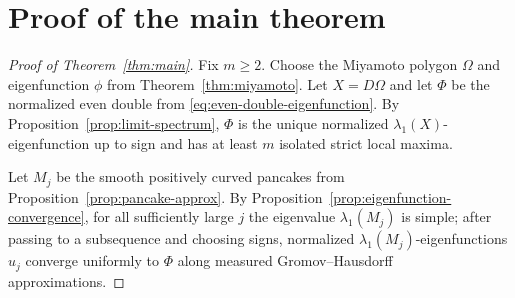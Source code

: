 \documentclass[11pt]{amsart}
\numberwithin{equation}{section}
\newcommand{\Om}{\Omega}
\begin{document}
\section{Proof of the main theorem}\label{sec:proof-main}

\begin{proof}[Proof of Theorem~\ref{thm:main}]
Fix $m\ge2$.  Choose the Miyamoto polygon $\Om$ and eigenfunction $\phi$ from
Theorem~\ref{thm:miyamoto}.  Let $X=D\Om$ and let $\Phi$ be the normalized even
double from \eqref{eq:even-double-eigenfunction}.  By
Proposition~\ref{prop:limit-spectrum}, $\Phi$ is the unique normalized
$\lambda_1(X)$-eigenfunction up to sign and has at least $m$ isolated strict
local maxima.

Let $M_j$ be the smooth positively curved pancakes from
Proposition~\ref{prop:pancake-approx}.  By
Proposition~\ref{prop:eigenfunction-convergence}, for all sufficiently large $j$
the eigenvalue $\lambda_1(M_j)$ is simple; after passing to a subsequence and
choosing signs, normalized $\lambda_1(M_j)$-eigenfunctions $u_j$ converge
uniformly to $\Phi$ along measured Gromov--Hausdorff approximations.


\end{proof}
\end{document}
